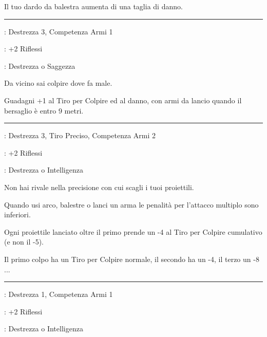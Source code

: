 \begin{multicols}{2}
Il tuo dardo da balestra aumenta di una taglia di danno.

\smallskip\noindent\rule{\linewidth}{2pt} \hypertarget{Tiro Preciso}{}\medskip{}
\noindent
\begin{description}[noitemsep, topsep=0pt, parsep=0pt, partopsep=0pt, leftmargin=0cm, labelwidth=2.5cm]
    \item[\textbf{Requisito}]: Destrezza 3, Competenza Armi 1
    \item[\textbf{Tiri Salvezza}]: +2 Riflessi
    \item[\textbf{Caratteristica}]: Destrezza o Saggezza
\end{description}

Da vicino sai colpire dove fa male.

Guadagni +1 al Tiro per Colpire ed al danno, con armi da lancio quando il bersaglio è entro 9 metri.


\smallskip\noindent\rule{\linewidth}{2pt} \hypertarget{Tiro Rapido}{}\medskip{}
\noindent\label{Tiro Rapido}
\begin{description}[noitemsep, topsep=0pt, parsep=0pt, partopsep=0pt, leftmargin=0cm, labelwidth=2.5cm]
    \item[\textbf{Requisito}]: Destrezza 3, Tiro Preciso, Competenza Armi 2
    \item[\textbf{Tiri Salvezza}]: +2 Riflessi
    \item[\textbf{Caratteristica}]: Destrezza o Intelligenza
\end{description}

Non hai rivale nella precisione con cui scagli i tuoi proiettili.

Quando usi arco, balestre o lanci un arma le penalità per l'attacco multiplo sono inferiori.

Ogni proiettile lanciato oltre il primo prende un -4 al Tiro per Colpire cumulativo (e non il -5).

Il primo colpo ha un Tiro per Colpire normale, il secondo ha un -4, il terzo un -8 ...

\smallskip\noindent\rule{\linewidth}{2pt} \hypertarget{Toccata e fuga}{}\medskip{}
\noindent
\begin{description}[noitemsep, topsep=0pt, parsep=0pt, partopsep=0pt, leftmargin=0cm, labelwidth=2.5cm]
    \item[\textbf{Requisito}]: Destrezza 1, Competenza Armi 1
    \item[\textbf{Tiri Salvezza}]: +2 Riflessi
    \item[\textbf{Caratteristica}]: Destrezza o Intelligenza
\end{description}


\end{multicols}
